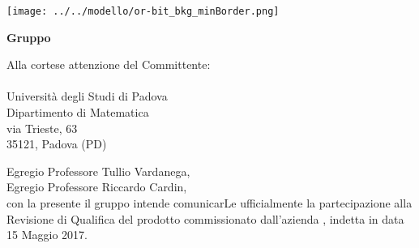   
\begin{titlepage}
	
	\begin{center}
	 	
	\texttt{[image: ../../modello/or-bit\_bkg\_minBorder.png]} 
	\begin{Huge} 
	 	\textbf{Gruppo \GroupName{}}
	\end{Huge}
	\end{center}
	
	\vspace{1cm}
	\begin{large}
	\begin{flushright}
		Alla cortese attenzione del Committente: \\
		\Committente \\
		Università degli Studi di Padova \\
		Dipartimento di Matematica \\
		via Trieste, 63 \\
		35121, Padova (PD) 
		
		\vspace{0,3cm}
		
	
	\end{flushright}

	\vspace{1cm}
	
	Egregio Professore Tullio Vardanega,\\
	Egregio Professore Riccardo Cardin, \\
	
	con la presente il gruppo \GroupName{} intende comunicarLe ufficialmente la partecipazione alla Revisione di Qualifica del prodotto \ProjectName{} commissionato dall'azienda \Proponente{}, indetta in data 15 Maggio 2017.\\	
	

\end{large}
\end{titlepage}
